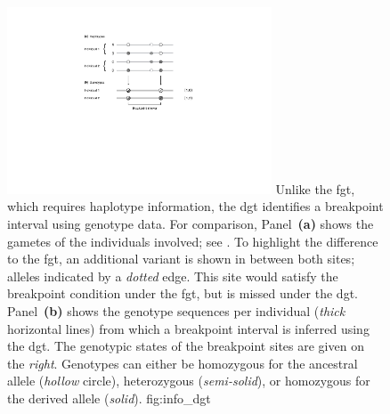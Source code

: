 

\begin{figure}[!htb]
\centering
\includegraphics[width=0.7\textwidth]{./img/ch3/info_dgt}
{Unlike the \gls{fgt}, which requires haplotype information, the \gls{dgt} identifies a breakpoint interval using genotype data.
For comparison, Panel~\textbf{(a)} shows the  gametes of the  individuals involved; see .
To highlight the difference to the \gls{fgt}, an additional variant is shown in between both sites; alleles indicated by a \emph{dotted} edge.
This site would satisfy the breakpoint condition under the \gls{fgt}, but is missed under the \gls{dgt}.
Panel~\textbf{(b)} shows the  genotype sequences per individual (\emph{thick} horizontal lines) from which a breakpoint interval is inferred using the \gls{dgt}.
The genotypic states of the breakpoint sites are given on the \emph{right}.
Genotypes can either be homozygous for the ancestral allele (\emph{hollow} circle), heterozygous (\emph{semi-solid}), or homozygous for the derived allele (\emph{solid}).}
{fig:info_dgt}
\end{figure}
